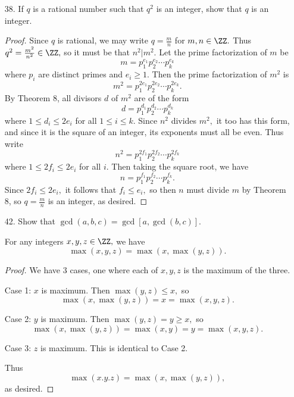 \documentclass{article}
\begin{document}
\begin{itemize}
	\item[38.] If $q$ is a rational number such that $q^2$ is an integer, show that $q$ is an integer.
		\begin{proof}
			Since $q$ is rational, we may write $q=\frac{m}{n}$ for $m, n\in\ZZ.$ Thus $q^2=\frac{m^2}{n^2}\in\ZZ,$ so it must be that $n^2|m^2.$ Let the prime factorization of $m$ be \[m=p_1^{e_1}p_2^{e_2}\cdots p_k^{e_k}\] where $p_i$ are distinct primes and $e_i\ge1.$ Then the prime factorization of $m^2$ is \[m^2 = p_1^{2e_1}p_2^{2e_2}\cdots p_k^{2e_k}.\] By Theorem 8, all divisors $d$ of $m^2$ are of the form \[d = p_1^{d_1}p_2^{d_2}\cdots p_k^{d_k}\] where $1\le d_i\le 2e_i$ for all $1\le i\le k.$ Since $n^2$ divides $m^2,$ it too has this form, and since it is the square of an integer, its exponents must all be even. Thus write \[n^2 = p_1^{2f_1}p_2^{2f_2}\cdots p_k^{2f_k}\] where $1\le 2f_i\le 2e_i$ for all $i.$ Then taking the square root, we have \[n=p_1^{f_1}p_2^{f_2}\cdots p_k^{f_k}.\] Since $2f_i\le 2e_i,$ it follows that $f_i\le e_i,$ so then $n$ must divide $m$ by Theorem 8, so $q=\frac{m}{n}$ is an integer, as desired. 
			
		\end{proof}
	
	\item[42.] Show that $\gcd{(a, b, c)} = \gcd{[a, \gcd{(b, c)}]}.$
		\begin{lemma}
			For any integers $x, y, z\in\ZZ,$ we have \[\max{(x, y, z)}=\max{(x, \max{(y, z)})}.\]
		\end{lemma}
		\begin{proof}
			We have 3 cases, one where each of $x, y, z$ is the maximum of the three. 

		Case 1: $x$ is maximum. Then $\max{(y, z)}\le x,$ so \[\max{(x, \max{(y, z)})} = x = \max{(x, y, z)}.\]

		Case 2: $y$ is maximum. Then $\max{(y, z)}=y\ge x,$ so \[\max{(x, \max{(y, z)})} = \max{(x, y)} = y = \max{(x, y, z)}.\]

		Case 3: $z$ is maximum. This is identical to Case 2. 

		Thus \[\max{(x. y. z)} = \max{(x, \max{(y, z)})}, \] as desired.
		\end{proof}
		


\end{itemize}
\end{document}
